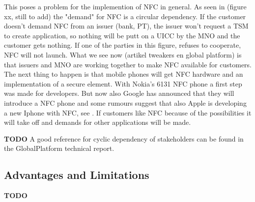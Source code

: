 This poses a problem for the implemention of NFC in general.
As seen in (figure xx, still to add) the "demand" for NFC is a circular dependency.
If the customer doesn't demand NFC from an issuer (bank, PT), the issuer won't request a TSM to create application, so nothing will be putt on a UICC by the MNO and the customer gets nothing.
If one of the parties in this figure, refuses to cooperate, NFC will not launch.
What we see now (artikel tweakers en global platform) is that issuers and MNO are working together to make NFC available for customers.
The next thing to happen is that mobile phones will get NFC hardware and an implementation of a secure element.
With Nokia's 6131 NFC phone a first step was made for developers.
But now also Google has announced that they will introduce a NFC phone and some rumours suggest that also Apple is developing a new Iphone with NFC, see \cite{nu_artikel}.
If customers like NFC because of the possibilities it will take off and demands for other applications will be made. 

\textbf{TODO} A good reference for cyclic dependency of stakeholders can be found in the GlobalPlatform technical report.








\subsection{Advantages and Limitations}
\textbf{TODO}

